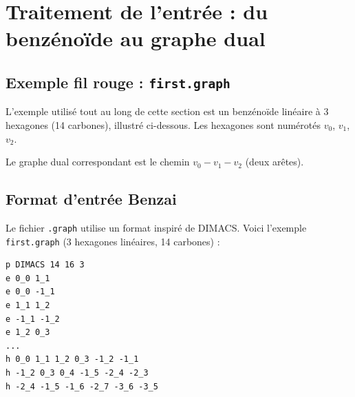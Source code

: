 \section{Traitement de l'entrée : du benzénoïde au graphe dual}

\subsection{Exemple fil rouge : \texttt{first.graph}}

L'exemple utilisé tout au long de cette section est un benzénoïde linéaire à 3 hexagones
(14 carbones), illustré ci-dessous. Les hexagones sont numérotés $v_0$, $v_1$, $v_2$.

\begin{center}
\end{center}

Le graphe dual correspondant est le chemin $v_0 - v_1 - v_2$ (deux arêtes).

\subsection{Format d'entrée Benzai}

Le fichier \texttt{.graph} utilise un format inspiré de DIMACS. Voici l'exemple
\texttt{first.graph} (3 hexagones linéaires, 14 carbones) :

\begin{lstlisting}[style=benzai]
p DIMACS 14 16 3
e 0_0 1_1
e 0_0 -1_1
e 1_1 1_2
e -1_1 -1_2
e 1_2 0_3
...
h 0_0 1_1 1_2 0_3 -1_2 -1_1
h -1_2 0_3 0_4 -1_5 -2_4 -2_3
h -2_4 -1_5 -1_6 -2_7 -3_6 -3_5
\end{lstlisting}

